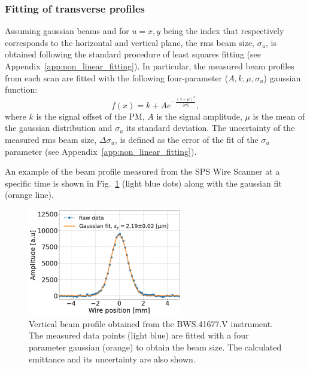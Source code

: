 \subsubsection*{Fitting of transverse profiles}
Assuming gaussian beams and for $u=x,y$ being the index that respectively corresponds to the horizontal and vertical plane, the rms beam size, $\sigma_u$, is obtained following the standard procedure of least squares fitting (see Appendix~\ref{app:non_linear_fitting}). In particular, the measured beam profiles from each scan are fitted with the following four-parameter ($A, k, \mu, \sigma_u$) gaussian function:
\begin{equation}\label{eq:4p_gauss}
   f(x) = k + A e^{-\frac{(x-\mu)^2}{2 \sigma_u^2}},
\end{equation}
where $k$ is the signal offset of the PM, $A$ is the signal amplitude, $\mu$ is the mean of the gaussian distribution and $\sigma_u$ its standard deviation. The uncertainty of the measured rms beam size, $\Delta \sigma_u$, is defined as the error of the fit of the $\sigma_u$ parameter (see Appendix~\ref{app:non_linear_fitting}).


An example of the beam profile measured from the SPS Wire Scanner at a specific time is shown in Fig.~\ref{fig:WS_example_V_profile} (light blue dots) along with the gaussian fit (orange line).
\begin{figure}[!h]
   \centering         
   \includegraphics[width=0.6\textwidth]{images/Ch5/SPS.BWS.41677.V_ROT_2018-09-05 15_45_01.33500_raw_and_fit.png}
       \caption{Vertical beam profile obtained from the BWS.41677.V instrument. The measured data points (light blue) are fitted with a four parameter gaussian (orange) to obtain the beam size. The calculated emittance and its uncertainty are also shown.}
       \label{fig:WS_example_V_profile}
\end{figure}
   
